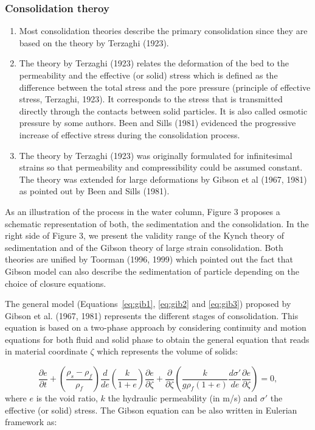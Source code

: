 \subsubsection*{Consolidation theroy}
\begin{enumerate}
\item Most consolidation theories describe the primary consolidation since they
are based on the theory by Terzaghi (1923).
\item The theory by Terzaghi (1923) relates the deformation of the bed to the
permeability and the effective (or solid) stress which is defined as the
difference between the total stress and the pore pressure (principle of
effective stress, Terzaghi, 1923). It corresponds to the stress that is
transmitted directly through the contacts between solid particles. It is
also called osmotic pressure by some authors. Been and Sills (1981)
evidenced the progressive increase of effective stress during the
consolidation process.
\item The theory by Terzaghi (1923) was originally formulated for infinitesimal
strains so that permeability and compressibility could be assumed constant.
The theory was extended for large deformations by Gibson et al (1967, 1981)
as pointed out by Been and Sills (1981).
\end{enumerate}

As an illustration of the process in the water column, Figure 3 proposes a
schematic representation of both, the sedimentation and the consolidation.
In the right side of Figure 3, we present the validity range of the Kynch
theory of sedimentation and of the Gibson theory of large strain
consolidation. Both theories are unified by Toorman (1996, 1999) which pointed out the fact
that Gibson model can also describe the sedimentation of particle depending
on the choice of closure equations.

The general model (Equations~\ref{eq:gib1}, \ref{eq:gib2} and \ref{eq:gib3}) proposed by Gibson et al. (1967, 1981)
represents the different stages of consolidation. This equation is based on
a two-phase approach by considering continuity and motion equations for both
fluid and solid phase to obtain the general equation that reads in material
coordinate $\zeta$ which represents the volume of solids:

\begin{equation}\label{eq:gib1}
\dfrac{\partial e}{\partial t} + \left(\dfrac{\rho_s-\rho_f}{\rho_f}\right) 
\dfrac{d}{de} \left( \dfrac{k}{1+e}\right) \dfrac{\partial e}{\partial \zeta} + 
\dfrac{\partial}{\partial \zeta} \left(\dfrac{k}{g\rho_f(1+e)} \dfrac{d\sigma'}{de}
\dfrac{\partial e}{\partial\zeta}\right) = 0, 
\end{equation}
where $e$ is the void ratio, $k$ the hydraulic permeability (in m/s) and $\sigma'$ the effective (or solid) stress. The Gibson equation can be also written in Eulerian framework as:

